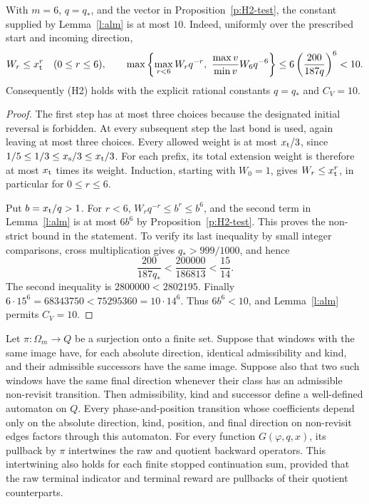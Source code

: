 \begin{lemma}\label{l:H2-CV}
With \(m=6\), \(q=q_*\), and the vector in Proposition~\ref{p:H2-test},
the constant supplied by Lemma~\ref{l:alm} is at most \(10\).
Indeed, uniformly over the prescribed start and incoming direction,
\[
 W_r\le x_{\rm t}^r\quad(0\le r\le6),\qquad
 \max\left\{\max_{r<6}W_rq^{-r},\
                 \frac{\max v}{\min v}W_6q^{-6}\right\}
 \le6\left(\frac{200}{187q}\right)^6<10.
\]
Consequently (H2) holds with the explicit rational constants
\(q=q_*\) and \(C_V=10\).
\end{lemma}

\begin{proof}
The first step has at most three choices because the designated
initial reversal is forbidden. At every subsequent step the last
bond is used, again leaving at most three choices. Every allowed
weight is at most \(x_{\rm t}/3\), since
\(1/5\le1/3\le x_{\rm s}/3\le x_{\rm t}/3\).
For each prefix, its total extension weight is therefore at most
\(x_{\rm t}\) times its weight. Induction, starting with \(W_0=1\),
gives \(W_r\le x_{\rm t}^r\), in particular for \(0\le r\le6\).

Put \(b=x_{\rm t}/q>1\). For \(r<6\),
\(W_rq^{-r}\le b^r\le b^6\), and the second term in
Lemma~\ref{l:alm} is at most \(6b^6\) by
Proposition~\ref{p:H2-test}. This proves the non-strict bound
in the statement. To verify its last inequality by small integer
comparisons, cross multiplication gives
\(q_*>999/1000\), and hence
\[
 \frac{200}{187q_*}<\frac{200000}{186813}<\frac{15}{14}.
\]
The second inequality is \(2800000<2802195\).
Finally
\(6\cdot15^6=68343750<75295360=10\cdot14^6\).
Thus \(6b^6<10\), and Lemma~\ref{l:alm} permits \(C_V=10\).
\end{proof}

\begin{lemma}\label{l:automaton-quotient}
Let \(\pi:\Omega_m\to Q\) be a surjection onto a finite set.
Suppose that windows with the same image have, for each absolute
direction, identical admissibility and kind, and their admissible
successors have the same image. Suppose also that two such windows
have the same final direction whenever their class has an admissible
non-revisit transition.
Then admissibility, kind and successor define a well-defined automaton
on \(Q\). Every phase-and-position transition whose coefficients
depend only on the absolute direction, kind, position, and final
direction on non-revisit edges factors through this automaton.
For every function \(G(\varphi,q,x)\), its pullback by \(\pi\)
intertwines the raw and quotient backward operators. This
intertwining also holds for each finite stopped continuation sum,
provided that the raw terminal indicator and terminal reward are
pullbacks of their quotient counterparts.
\end{lemma}

